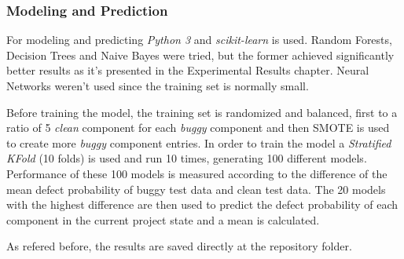 \subsubsection{Modeling and Prediction}

For modeling and predicting \emph{Python 3} and \emph{scikit-learn} is used.
Random Forests, Decision Trees and Naive Bayes were tried, but the former achieved significantly better results as it's presented in the Experimental Results chapter.
Neural Networks weren't used since the training set is normally small.

Before training the model, the training set is randomized and balanced, first to a ratio of 5 \emph{clean} component for each \emph{buggy} component 
and then SMOTE is used to create more \emph{buggy} component entries. In order to train the model a \emph{Stratified KFold} (10 folds) is used and run 10 times, 
generating 100 different models. Performance of these 100 models is measured according to the difference of the mean defect probability of buggy test data and clean test data. 
The 20 models with the highest difference are then used to predict the defect probability of each component in the current project state and a mean is calculated.

As refered before, the results are saved directly at the repository folder.
